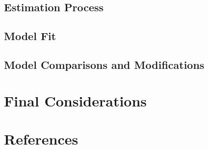 \documentclass[
  a4paper,
]{article}
\begin{document}
\subsection{Estimation Process}\label{estimation-process-1}

\subsection{Model Fit}\label{model-fit-1}

\subsection{Model Comparisons and
Modifications}\label{model-comparisons-and-modifications-1}


\section{Final Considerations}\label{final-considerations}


\section*{References}\label{references}

\end{document}
